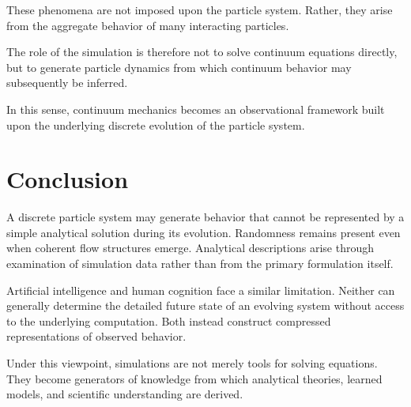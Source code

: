 These phenomena are not imposed upon the particle system. Rather, they arise from the aggregate behavior of many interacting particles.

The role of the simulation is therefore not to solve continuum equations directly, but to generate particle dynamics from which continuum behavior may subsequently be inferred.

In this sense, continuum mechanics becomes an observational framework built upon the underlying discrete evolution of the particle system.

\section{Conclusion}

A discrete particle system may generate behavior that cannot be represented by a simple analytical solution during its evolution. Randomness remains present even when coherent flow structures emerge. Analytical descriptions arise through examination of simulation data rather than from the primary formulation itself.

Artificial intelligence and human cognition face a similar limitation. Neither can generally determine the detailed future state of an evolving system without access to the underlying computation. Both instead construct compressed representations of observed behavior.

Under this viewpoint, simulations are not merely tools for solving equations. They become generators of knowledge from which analytical theories, learned models, and scientific understanding are derived.



